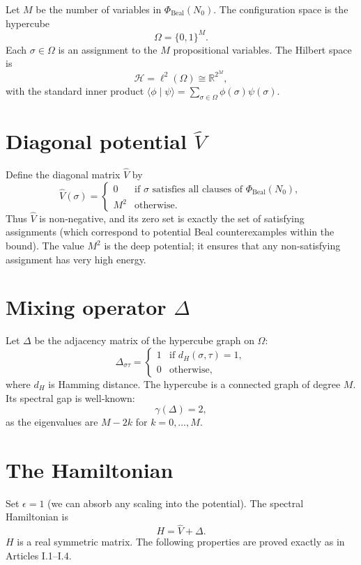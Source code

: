 \documentclass[11pt,a4paper]{article}
\begin{document}
Let \(M\) be the number of variables in \(\Phi_{\text{Beal}}(N_0)\). The configuration space is the hypercube
\[
\Omega = \{0,1\}^M.
\]
Each \(\sigma \in \Omega\) is an assignment to the \(M\) propositional variables. The Hilbert space is
\[
\mathcal{H} = \ell^2(\Omega) \cong \mathbb{R}^{2^M},
\]
with the standard inner product \(\langle \phi \mid \psi \rangle = \sum_{\sigma\in\Omega} \phi(\sigma)\psi(\sigma)\).

\section{Diagonal potential \(\hat{V}\)}

Define the diagonal matrix \(\hat{V}\) by
\[
\hat{V}(\sigma) = 
\begin{cases}
0 & \text{if }\sigma\text{ satisfies all clauses of } \Phi_{\text{Beal}}(N_0),\\
M^2 & \text{otherwise}.
\end{cases}
\]
Thus \(\hat{V}\) is non‑negative, and its zero set is exactly the set of satisfying assignments (which correspond to potential Beal counterexamples within the bound). The value \(M^2\) is the deep potential; it ensures that any non‑satisfying assignment has very high energy.

\section{Mixing operator \(\Delta\)}

Let \(\Delta\) be the adjacency matrix of the hypercube graph on \(\Omega\):
\[
\Delta_{\sigma\tau} = \begin{cases}
1 & \text{if }d_H(\sigma,\tau)=1,\\
0 & \text{otherwise},
\end{cases}
\]
where \(d_H\) is Hamming distance. The hypercube is a connected graph of degree \(M\). Its spectral gap is well‑known:
\[
\gamma(\Delta) = 2,
\]
as the eigenvalues are \(M - 2k\) for \(k=0,\dots,M\).

\section{The Hamiltonian}

Set \(\epsilon = 1\) (we can absorb any scaling into the potential). The spectral Hamiltonian is
\[
H = \hat{V} + \Delta.
\]
\(H\) is a real symmetric matrix. The following properties are proved exactly as in Articles I.1–I.4.
\end{document}
